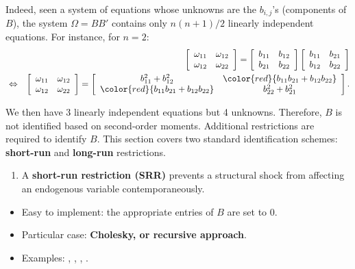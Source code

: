 \documentclass[
  12pt,
]{book}
\providecommand{\tightlist}{%
  \setlength{\itemsep}{0pt}\setlength{\parskip}{0pt}}
\theoremstyle{definition}
\theoremstyle{definition}
\theoremstyle{definition}
\theoremstyle{definition}
\theoremstyle{remark}
\begin{document}
Indeed, seen a system of equations whose unknowns are the \(b_{i,j}\)'s (components of \(B\)), the system \(\Omega = BB'\) contains only \(n(n+1)/2\) linearly independent equations. For instance, for \(n=2\):
\begin{eqnarray*}
&&\left[
\begin{array}{cc}
\omega_{11} & \omega_{12} \\
\omega_{12} & \omega_{22}
\end{array}
\right] = \left[
\begin{array}{cc}
b_{11} & b_{12} \\
b_{21} & b_{22}
\end{array}
\right]\left[
\begin{array}{cc}
b_{11} & b_{21} \\
b_{12} & b_{22}
\end{array}
\right]\\
&\Leftrightarrow&\left[
\begin{array}{cc}
\omega_{11} & \omega_{12} \\
\omega_{12} & \omega_{22}
\end{array}
\right] = \left[
\begin{array}{cc}
b_{11}^2+b_{12}^2 & \color{red}{b_{11}b_{21}+b_{12}b_{22}} \\
\color{red}{b_{11}b_{21}+b_{12}b_{22}} & b_{22}^2 + b_{21}^2
\end{array}
\right].
\end{eqnarray*}

We then have 3 linearly independent equations but 4 unknowns. Therefore, \(B\) is not identified based on second-order moments. Additional restrictions are required to identify \(B\). This section covers two standard identification schemes: \textbf{short-run} and \textbf{long-run} restrictions.

\begin{enumerate}
\def\labelenumi{\arabic{enumi}.}
\tightlist
\item
  A \textbf{short-run restriction (SRR)} prevents a structural shock from affecting an endogenous variable contemporaneously.
\end{enumerate}

\begin{itemize}
\tightlist
\item
  Easy to implement: the appropriate entries of \(B\) are set to 0.
\item
  Particular case: \textbf{Cholesky, or recursive approach}.
\item
  Examples: \citet{BERNANKE198649}, \citet{Sims_1986}, \citet{Gali_1992}, \citet{RubioRamirez_et_al_2010}.
\end{itemize}
\end{document}
